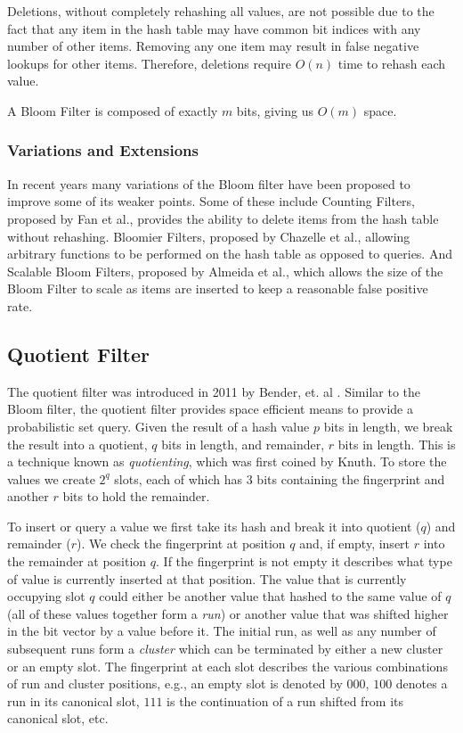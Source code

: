 \documentclass[twoside]{article}
\begin{document}
Deletions, without completely rehashing all values, are not possible due to the fact that any item in the hash table may have common bit indices with any number of other items. Removing any one item may result in false negative lookups for other items. Therefore, deletions require $O(n)$ time to rehash each value.

A Bloom Filter is composed of exactly $m$ bits, giving us $O(m)$ space.

\subsubsection{Variations and Extensions}

In recent years many variations of the Bloom filter have been proposed to improve some of its weaker points. Some of these include Counting Filters, proposed by Fan et al.\cite{fan}, provides the ability to delete items from the hash table without rehashing. Bloomier Filters, proposed by Chazelle et al.\cite{chazelle}, allowing arbitrary functions to be performed on the hash table as opposed to queries. And Scalable Bloom Filters, proposed by Almeida et al.\cite{almeida}, which allows the size of the Bloom Filter to scale as items are inserted to keep a reasonable false positive rate.

\subsection{Quotient Filter}

The quotient filter was introduced in 2011 by Bender, et. al \cite{bender}. Similar to the Bloom filter, the quotient filter provides space efficient means to provide a probabilistic set query. Given the result of a hash value $p$ bits in length, we break the result into a quotient, $q$ bits in length, and remainder, $r$ bits in length. This is a technique known as \emph{quotienting}, which was first coined by Knuth\cite{knuth}. To store the values we create $2^q$ slots, each of which has 3 bits containing the fingerprint and another $r$ bits to hold the remainder. 

To insert or query a value we first take its hash and break it into quotient ($q$) and remainder ($r$). We check the fingerprint at position $q$ and, if empty, insert $r$ into the remainder at position $q$. If the fingerprint is not empty it describes what type of value is currently inserted at that position. The value that is currently occupying slot $q$ could either be another value that hashed to the same value of $q$ (all of these values together form a \emph{run}) or another value that was shifted higher in the bit vector by a value before it. The initial run, as well as any number of subsequent runs form a \emph{cluster} which can be terminated by either a new cluster or an empty slot. The fingerprint at each slot describes the various combinations of run and cluster positions, e.g., an empty slot is denoted by $000$, $100$ denotes a run in its canonical slot, $111$ is the continuation of a run shifted from its canonical slot, etc.
\end{document}
